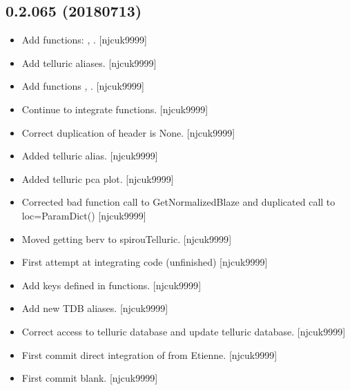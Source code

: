 \documentclass[a4paper,10pt,english]{report}
\begin{document}
\subsection{0.2.065 (2018\sphinxhyphen{}07\sphinxhyphen{}13)}
\label{\detokenize{misc/changelog:id413}}\begin{itemize}
\item {} 
Add functions: , . {[}njcuk9999{]}

\item {} 
Add telluric aliases. {[}njcuk9999{]}

\item {} 
Add functions , .
{[}njcuk9999{]}

\item {} 
Continue to integrate functions. {[}njcuk9999{]}

\item {} 
Correct duplication of header is None. {[}njcuk9999{]}

\item {} 
Added telluric alias. {[}njcuk9999{]}

\item {} 
Added telluric pca plot. {[}njcuk9999{]}

\item {} 
Corrected bad function call to GetNormalizedBlaze and duplicated call
to loc=ParamDict() {[}njcuk9999{]}

\item {} 
Moved getting berv to spirouTelluric. {[}njcuk9999{]}

\item {} 
First attempt at integrating code (unfinished) {[}njcuk9999{]}

\item {} 
Add keys defined in functions. {[}njcuk9999{]}

\item {} 
Add new TDB aliases. {[}njcuk9999{]}

\item {} 
Correct access to telluric database and update telluric database.
{[}njcuk9999{]}

\item {} 
First commit \sphinxhyphen{} direct integration of  from Etienne.
{[}njcuk9999{]}

\item {} 
First commit \sphinxhyphen{} blank. {[}njcuk9999{]}


\end{itemize}
\end{document}
